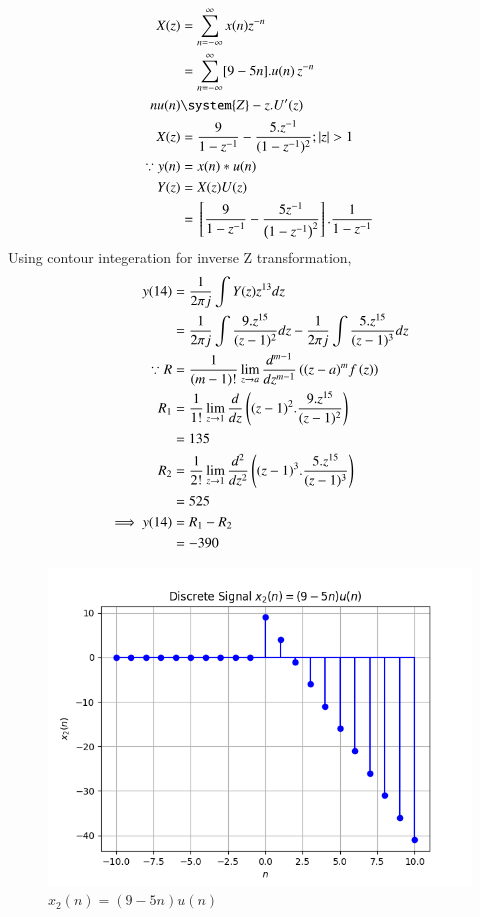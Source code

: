\documentclass[journal,12pt,twocolumn]{IEEEtran}
\theoremstyle{remark}
\begin{document}
\begin{enumerate} [label=(\roman*)]
    \begin{align}
         X(z) &= \sum_{n = -\infty}^{\infty} x(n) z^{-n} \label{eq:z-transform}\\
          &= \sum_{n = -\infty}^{\infty}[9 - 5n].u(n) \, z^{-n} \\
        nu(n) &\system{Z} -z.U'(z)\\
         X(z) &= \frac{9}{1-z^{-1}} - \frac{5.z^{-1}}{(1-z^{-1})^2} ; |z|>1\\
        \because y(n) &= x(n) * u(n)\\
        Y(z) &= X(z)U(z)\\
         &= \sbrak{\frac{9}{1-z^{-1}} - \frac{5 z^{-1}}{\brak{1-z^{-1}}^2} }.\frac{1}{1-z^{-1}}
    \end{align}
    Using contour integeration for inverse Z transformation,\\
    \begin{align}
        y(14) &= \frac{1}{2\pi j}\int Y(z) z^{13} dz \\
         &= \frac{1}{2\pi j}\int \frac{9.z^{15}}{(z-1)^{2}} dz - \frac{1}{2\pi j}\int \frac{5.z^{15}}{(z-1)^{3}} dz\\
        \because R&=\frac{1}{\left(m-1\right)!}\lim\limits_{z\to a}\frac{d^{m-1}}{dz^{m-1}}\left({(z-a)}^{m}f\left(z\right)\right)\\
        R_1 &=\frac{1}{1!}\lim\limits_{z\to 1}\frac{d}{dz}\left((z-1)^2.\frac{9.z^{15}}{(z-1)^{2}}\right)\\
         &= 135\\
        R_2 &=\frac{1}{2!}\lim\limits_{z\to 1}\frac{d^2}{dz^2}\left((z-1)^3.\frac{5.z^{15}}{(z-1)^{3}}\right)\\
         &= 525\\
        \implies y(14) &= R_1 - R_2 \\
        &= -390
    \end{align}
    
    \begin{figure}[!h] 
    \centering
    \includegraphics[width=\columnwidth]{figs/signal_x2.png}
    \caption{$x_2(n)=(9-5n)u(n)$}
    \label{fig:Graph2}
    \end{figure}

\end{enumerate}
\end{document}
